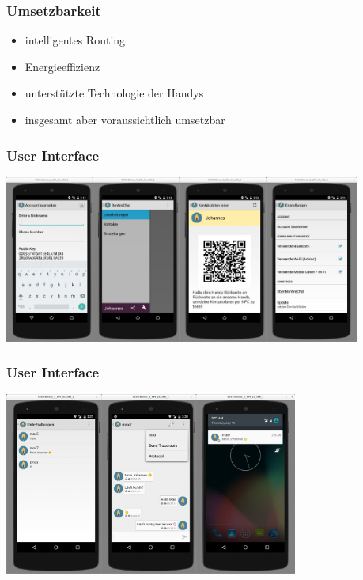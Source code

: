 \documentclass[accentcolor=tud2d,colorbacktitle]{tudbeamer}
\begin{document}
  \begin{frame}
    \frametitle{Umsetzbarkeit}
    \begin{itemize}
      \item intelligentes Routing
      \item Energieeffizienz
      \item unterstützte Technologie der Handys
    \end{itemize}
    \begin{itemize}
      \item insgesamt aber voraussichtlich umsetzbar
    \end{itemize}
  \end{frame}

  \begin{frame}
    \frametitle{User Interface}
    \begin{center}
      \includegraphics[height=5.5cm]{ui1.jpg}
    \end{center}
  \end{frame}

  \begin{frame}
    \frametitle{User Interface}
    \begin{center}
      \includegraphics[height=6cm]{ui2.jpg}
    \end{center}
  \end{frame}
\end{document}
